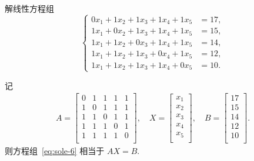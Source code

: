 \documentclass[../libro.tex]{subfiles}
\begin{document}
\begin{example}
    解线性方程组
    \begin{equation}
        \left\{ %
        \begin{aligned}
            0 x_1 + 1 x_2 + 1 x_3 + 1 x_4 + 1 x_5 & = 17, \\
            1 x_1 + 0 x_2 + 1 x_3 + 1 x_4 + 1 x_5 & = 15, \\
            1 x_1 + 1 x_2 + 0 x_3 + 1 x_4 + 1 x_5 & = 14, \\
            1 x_1 + 1 x_2 + 1 x_3 + 0 x_4 + 1 x_5 & = 12, \\
            1 x_1 + 1 x_2 + 1 x_3 + 1 x_4 + 0 x_5 & = 10.
        \end{aligned}
        \right. %
        \label{eq:sole-6}
    \end{equation}

    记
    \begin{align*}
        A =
        \begin{bmatrix}
            0 & 1 & 1 & 1 & 1 \\
            1 & 0 & 1 & 1 & 1 \\
            1 & 1 & 0 & 1 & 1 \\
            1 & 1 & 1 & 0 & 1 \\
            1 & 1 & 1 & 1 & 0 \\
        \end{bmatrix},
        \quad
        X =
        \begin{bmatrix}
            x_1 \\
            x_2 \\
            x_3 \\
            x_4 \\
            x_5 \\
        \end{bmatrix},
        \quad
        B =
        \begin{bmatrix}
            17 \\
            15 \\
            14 \\
            12 \\
            10 \\
        \end{bmatrix}.
    \end{align*}
    则方程组~\eqref{eq:sole-6} 相当于 \(A X = B\).


\end{example}
\end{document}

